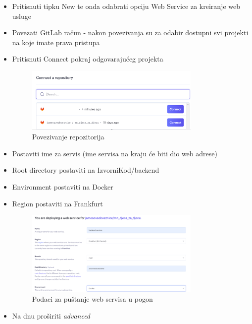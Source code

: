                 \begin{itemize}
                    \item Pritisnuti tipku New te onda odabrati opciju Web Service za kreiranje web usluge
                    \item Povezati GitLab račun - nakon povezivanja su za odabir dostupni svi projekti na koje imate prava pristupa
                    \item Pritisnuti Connect pokraj odgovarajućeg projekta
                    \begin{figure}[H]
    			\includegraphics[width=0.8\textwidth,height=0.25\textheight]{slike/connectRepo.png}
    			\centering
    			\caption{Povezivanje repozitorija}
    			\label{fig:connectRepo}
    			\end{figure}
                    \item Postaviti ime za servis (ime servisa na kraju će biti dio web adrese)
                    \item Root directory postaviti na IzvorniKod/backend
                    \item Environment postaviti na Docker
                    \item Region postaviti na Frankfurt
                    \begin{figure}[H]
    			\includegraphics[width=0.8\textwidth,height=0.25\textheight]{slike/deployWebService.png}
    			\centering
    			\caption{Podaci za puštanje web servisa u pogon}
    			\label{fig:deployWebService}
    			\end{figure}
                    \item Na dnu proširiti \textit{advanced}

\end{itemize}
